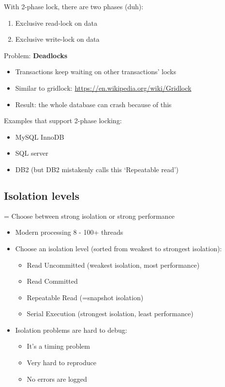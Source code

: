 \documentclass{article}
\begin{document}
With 2-phase lock, there are two phases (duh):

\begin{enumerate}
    \item Exclusive read-lock on data
    \item Exclusive write-lock on data
\end{enumerate}

Problem: \textbf{Deadlocks}

\begin{itemize}
    \item Transactions keep waiting on other transactions' locks
    \item Similar to gridlock: \url{https://en.wikipedia.org/wiki/Gridlock}
    \item Result: the whole database can crash because of this
\end{itemize}

Examples that support 2-phase locking:

\begin{itemize}
    \item MySQL InnoDB
    \item SQL server
    \item DB2 (but DB2 mistakenly calls this `Repeatable read')
\end{itemize}

\subsection{Isolation levels}

= Choose between strong isolation or strong performance

\begin{itemize}
    \item Modern processing 8 - 100+ threads
    \item Choose an isolation level (sorted from weakest to strongest isolation):
    \begin{itemize}
        \item Read Uncommitted (weakest isolation, most performance)
        \item Read Committed
        \item Repeatable Read (=snapshot isolation)
        \item Serial Execution (strongest isolation, least performance)
    \end{itemize}
    \item Isolation problems are hard to debug:
    \begin{itemize}
        \item It's a timing problem
        \item Very hard to reproduce
        \item No errors are logged
    \end{itemize}
\end{itemize}
\end{document}
